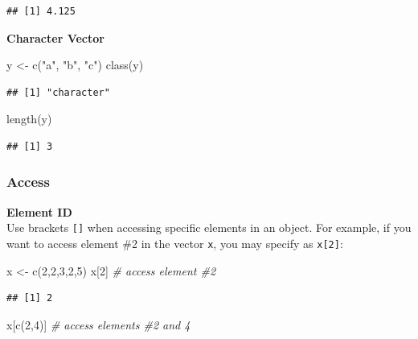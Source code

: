\documentclass[
]{article}
\newenvironment{Shaded}{\begin{snugshade}}{\end{snugshade}}
\newcommand{\CommentTok}[1]{\textcolor[rgb]{0.56,0.35,0.01}{\textit{#1}}}
\newcommand{\DecValTok}[1]{\textcolor[rgb]{0.00,0.00,0.81}{#1}}
\newcommand{\FunctionTok}[1]{\textcolor[rgb]{0.00,0.00,0.00}{#1}}
\newcommand{\NormalTok}[1]{#1}
\newcommand{\OtherTok}[1]{\textcolor[rgb]{0.56,0.35,0.01}{#1}}
\newcommand{\StringTok}[1]{\textcolor[rgb]{0.31,0.60,0.02}{#1}}
\begin{document}
\begin{verbatim}
## [1] 4.125
\end{verbatim}

\textbf{Character Vector}

\begin{Shaded}
\begin{Highlighting}[]
\NormalTok{y }\OtherTok{\textless{}{-}} \FunctionTok{c}\NormalTok{(}\StringTok{"a"}\NormalTok{, }\StringTok{"b"}\NormalTok{, }\StringTok{"c"}\NormalTok{)}
\FunctionTok{class}\NormalTok{(y)}
\end{Highlighting}
\end{Shaded}

\begin{verbatim}
## [1] "character"
\end{verbatim}

\begin{Shaded}
\begin{Highlighting}[]
\FunctionTok{length}\NormalTok{(y)}
\end{Highlighting}
\end{Shaded}

\begin{verbatim}
## [1] 3
\end{verbatim}

\hypertarget{access}{%
\subsubsection{Access}\label{access}}

\textbf{Element ID}\\
Use brackets \texttt{{[}{]}} when accessing specific elements in an object. For example, if you want to access element \#2 in the vector \texttt{x}, you may specify as \texttt{x{[}2{]}}:

\begin{Shaded}
\begin{Highlighting}[]
\NormalTok{x }\OtherTok{\textless{}{-}} \FunctionTok{c}\NormalTok{(}\DecValTok{2}\NormalTok{,}\DecValTok{2}\NormalTok{,}\DecValTok{3}\NormalTok{,}\DecValTok{2}\NormalTok{,}\DecValTok{5}\NormalTok{)}
\NormalTok{x[}\DecValTok{2}\NormalTok{] }\CommentTok{\# access element \#2}
\end{Highlighting}
\end{Shaded}

\begin{verbatim}
## [1] 2
\end{verbatim}

\begin{Shaded}
\begin{Highlighting}[]
\NormalTok{x[}\FunctionTok{c}\NormalTok{(}\DecValTok{2}\NormalTok{,}\DecValTok{4}\NormalTok{)] }\CommentTok{\# access elements \#2 and 4}
\end{Highlighting}
\end{Shaded}
\end{document}
